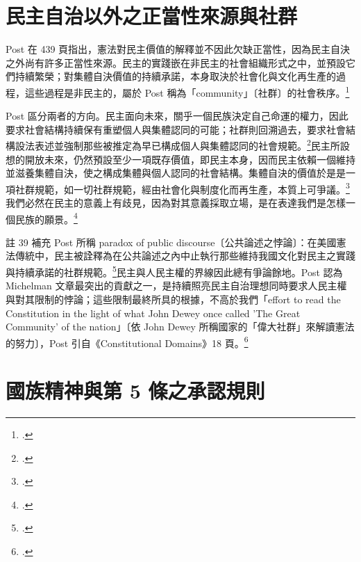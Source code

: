 \section{民主自治以外之正當性來源與社群}
\label{sec:60_post-6}

Post 在 439 頁指出，憲法對民主價值的解釋並不因此欠缺正當性，因為民主自決之外尚有許多正當性來源。民主的實踐嵌在非民主的社會組織形式之中，並預設它們持續繁榮；對集體自決價值的持續承諾，本身取決於社會化與文化再生產的過程，這些過程是非民主的，屬於 Post 稱為「community」〔社群〕的社會秩序。\footcite[439 \& nn.36--37]{post1998}

Post 區分兩者的方向。民主面向未來，關乎一個民族決定自己命運的權力，因此要求社會結構持續保有重塑個人與集體認同的可能；社群則回溯過去，要求社會結構設法表述並強制那些被推定為早已構成個人與集體認同的社會規範。\footcite[439 \& n.38]{post1998}民主所設想的開放未來，仍然預設至少一項既存價值，即民主本身，因而民主依賴一個維持並滋養集體自決，使之構成集體與個人認同的社會結構。集體自決的價值於是是一項社群規範，如一切社群規範，經由社會化與制度化而再生產，本質上可爭議。\footcite[439 \& n.40]{post1998}我們必然在民主的意義上有歧見，因為對其意義採取立場，是在表達我們是怎樣一個民族的願景。\footcite[439]{post1998}

註 39 補充 Post 所稱 paradox of public discourse〔公共論述之悖論〕：在美國憲法傳統中，民主被詮釋為在公共論述之內中止執行那些維持我國文化對民主之實踐與持續承諾的社群規範。\footcite[439 n.39]{post1998}民主與人民主權的界線因此總有爭論餘地。Post 認為 Michelman 文章最突出的貢獻之一，是持續照亮民主自治理想同時要求人民主權與對其限制的悖論；這些限制最終所具的根據，不高於我們「effort to read the Constitution in the light of what John Dewey once called 'The Great Community' of the nation」〔依 John Dewey 所稱國家的「偉大社群」來解讀憲法的努力〕，Post 引自《Constitutional Domains》18 頁。\footcite[440 \& n.41]{post1998}

\section{國族精神與第 5 條之承認規則}
\label{sec:60_post-7}

